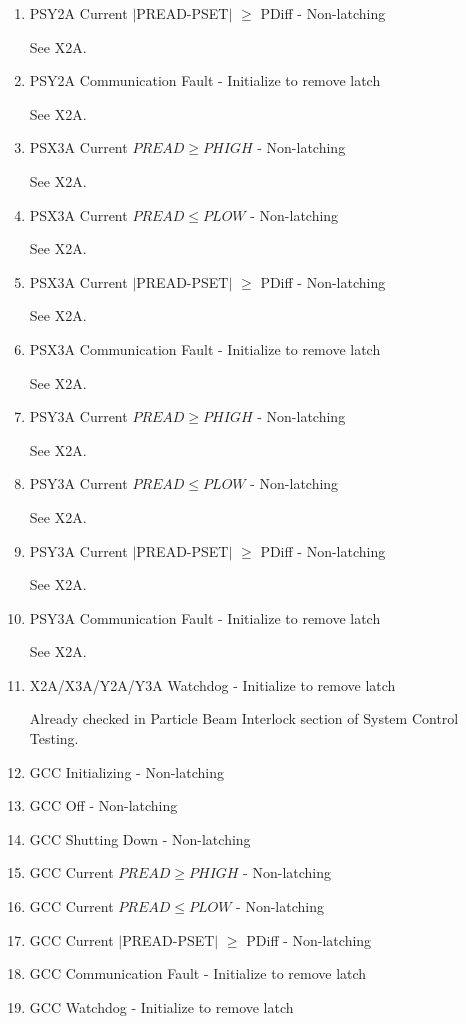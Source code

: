 \documentclass[11pt]{book}		%
\begin{document}
\begin{enumerate}
 \item PSY2A Current $\mid$PREAD-PSET$\mid$  $\geq$ PDiff - Non-latching

\color{red}
See X2A.
\color{black}

 \item PSY2A Communication Fault - Initialize to remove latch

\color{red}
See X2A.
\color{black}

 \item PSX3A Current $PREAD \geq PHIGH$ - Non-latching

\color{red}
See X2A.
\color{black}

 \item PSX3A Current $PREAD \leq PLOW$ - Non-latching

\color{red}
See X2A.
\color{black}

 \item PSX3A Current $\mid$PREAD-PSET$\mid$  $\geq$ PDiff - Non-latching

\color{red}
See X2A.
\color{black}

 \item PSX3A Communication Fault - Initialize to remove latch

\color{red}
See X2A.
\color{black}

 \item PSY3A Current $PREAD \geq PHIGH$ - Non-latching

\color{red}
See X2A.
\color{black}

 \item PSY3A Current $PREAD \leq PLOW$ - Non-latching

\color{red}
See X2A.
\color{black}

 \item PSY3A Current $\mid$PREAD-PSET$\mid$  $\geq$ PDiff - Non-latching

\color{red}
See X2A.
\color{black}

 \item PSY3A Communication Fault - Initialize to remove latch

\color{red}
See X2A.
\color{black}

 \item X2A/X3A/Y2A/Y3A Watchdog - Initialize to remove latch

\color{red}
Already checked in Particle Beam Interlock section of System Control Testing.
\color{black}

 \item GCC Initializing - Non-latching
 \item GCC Off - Non-latching
 \item GCC Shutting Down - Non-latching
 \item GCC Current $PREAD \geq PHIGH$ - Non-latching
 \item GCC Current $PREAD \leq PLOW$ - Non-latching
 \item GCC Current $\mid$PREAD-PSET$\mid$  $\geq$ PDiff - Non-latching
 \item GCC Communication Fault - Initialize to remove latch
 \item GCC Watchdog - Initialize to remove latch
\end{enumerate}
\end{document}
